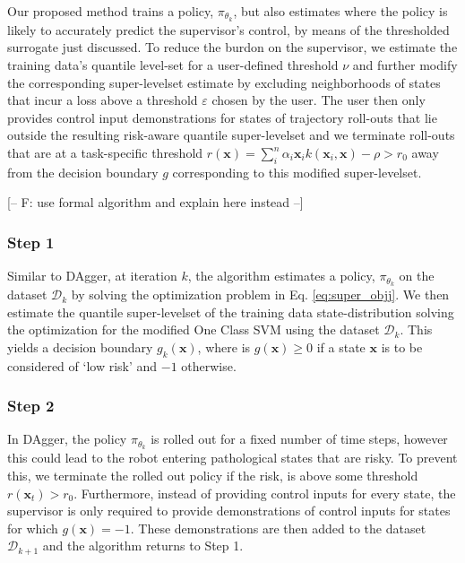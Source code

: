 \documentclass[10pt, conference]{ieeeconf}      %
\newcommand{\bx}{\mathbf{x}}
\begin{document}
Our proposed method trains a policy, $\pi_{\theta_k}$, but also estimates where the policy is likely to accurately
predict the supervisor's control, by means of the thresholded surrogate just discussed.  
To reduce the burdon on the supervisor, we estimate the training data's quantile level-set for a user-defined threshold
$\nu$ and further modify the corresponding super-levelset estimate by excluding neighborhoods of states that incur a loss
above a threshold $\varepsilon$ chosen by the user.
The user then only provides control input demonstrations for states of trajectory roll-outs that lie outside the
resulting risk-aware quantile super-levelset and we terminate roll-outs that are at a task-specific threshold $r(\bx) = \sum_i^n
\alpha_i \bx_i k(\bx_i,\bx)-\rho>r_0$ away from the decision boundary $g$ corresponding to this modified super-levelset.

{\color{blue} [-- F: use formal algorithm and explain here instead --]} 
\subsubsection{Step 1}

Similar to DAgger, at iteration $k$, the algorithm estimates a policy, $\pi_{\theta_k}$ on the dataset $\mathcal{D}_k$
by solving the optimization problem in Eq. \ref{eq:super_objj}. We then estimate the quantile super-levelset of the
training data state-distribution solving the optimization for the modified One Class SVM using the dataset $\mathcal{D}_k$. 
This yields a decision boundary $g_k(\bx)$, where is $g(\bx)\ge 0$ if a state $\bx$ is to be considered of `low risk' and $-1$ otherwise. 
 
 
 \subsubsection{Step 2}
 In DAgger, the policy $\pi_{\theta_k}$ is rolled out for a fixed number of time steps, however this could lead to the
 robot entering pathological states that are risky. To prevent this, we terminate the rolled out policy if the risk, is
 above some threshold $r(\bx_t) > r_0$.  Furthermore, instead of providing control inputs for every state, the supervisor is only required to 
 provide demonstrations of control inputs for states for which $g(\bx)=-1$.  These demonstrations are then added to the
 dataset $\mathcal{D}_{k+1}$ and the algorithm returns to Step 1. 
\end{document}
